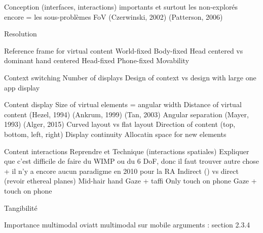 Conception (interfaces, interactions) importants et surtout les non-explorés encore = les sous-problèmes
        FoV (Czerwinski, 2002) (Patterson, 2006) \cite{KishishitaKiyokawaOrloskyEtAl2014} 

        Resolution

        Reference frame for virtual content 
            World-fixed \cite{EnsFinneganIrani2014} 
            Body-fixed \cite{EnsFinneganIrani2014} 
                Head centered vs dominant hand centered 
            Head-fixed \cite{EnsFinneganIrani2014} 
            Phone-fixed
            Movability \cite{EnsHincapie-RamosIrani2014}

        Context switching 
            Number of displays \cite{RashidNacentaQuigley2012} \cite{CauchardLoechtefeldFraserEtAl2012}
            Design of context vs design with large one app display \cite{BallNorth2008}

        Content display
            Size of virtual elements = angular width \cite{ShuppBallYostEtAl2006} \cite{BallNorth2008}
            Distance of virtual content (Hezel, 1994) (Ankrum, 1999) (Tan, 2003) \cite{ChanKaoChenEtAl2010} \cite{EnsFinneganIrani2014} 
            Angular separation (Mayer, 1993) \cite{EnsFinneganIrani2014} \cite{KishishitaKiyokawaOrloskyEtAl2014} (Alger, 2015) 
            Curved layout vs flat layout \cite{ShuppBallYostEtAl2006} 
            Direction of content (top, bottom, left, right) \cite{EnsFinneganIrani2014} 
            Display continuity \cite{TanCzerwinski2003} \cite{RashidNacentaQuigley2012}
            Allocatin space for new elements \cite{BellFeiner2000}

        Content interactions
        	Reprendre \cite{Bernatchez2008} et \cite{JankowskiHachet2013}
        	Technique (interactions spatiales)
	        	Expliquer que c'est difficile de faire du WIMP ou du 6 DoF, donc il faut trouver autre chose \citet{AzumaBaillotBehringerEtAl2001} + il n'y a encore aucun paradigme en 2010 pour la RA \cite{VanKrevelenPoelman2010}
	        	Indirect (\cite{TeatherStuerzlinger2011}) vs direct (revoir ethereal planes)
	            Mid-hair hand \cite{EnsFinneganIrani2014} \cite{ChanKaoChenEtAl2010} \cite{JonesSodhiForsythEtAl2012}
	            Gaze + taffi 
	            Only touch on phone 
	            Gaze + touch on phone

	        Tangibilité

            Importance multimodal oviatt \cite{Oviatt2003}
            multimodal sur mobile \cite{HuerstVanWezel2011}
            arguments : \cite{CarmignianiFurhtAnisettiEtAl2011} section 2.3.4

